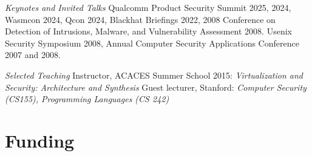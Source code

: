 \begin{resume}
{\em Keynotes and Invited Talks}\newline
Qualcomm Product Security Summit 2025, 2024, Wasmcon 2024, Qcon 2024, Blackhat Briefings
2022, 2008 Conference on Detection of Intrusions, Malware, and Vulnerability
Assessment 2008. Usenix Security Symposium 2008, Annual Computer Security
Applications Conference 2007 and 2008.

{\em Selected Teaching}\newline
Instructor, ACACES Summer School 2015: {\em Virtualization and Security:
Architecture and Synthesis}\newline
Guest lecturer, Stanford: {\em Computer Security (CS155), Programming Languages
(CS 242)}








\section{\sc Funding}


\end{resume}

